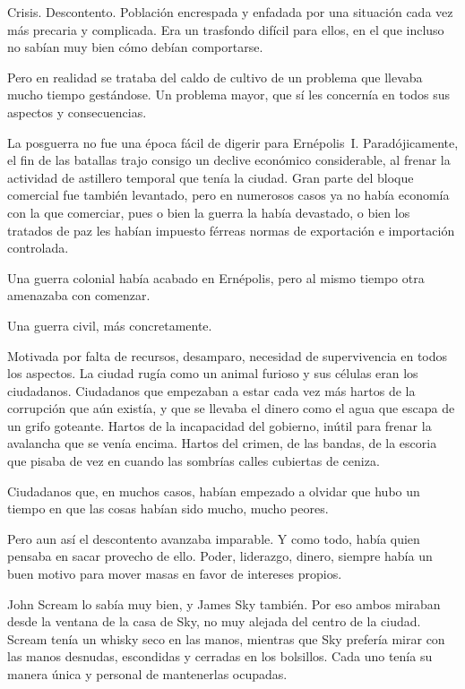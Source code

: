 \noindent
Crisis. Descontento. Población encrespada y enfadada por una situación cada vez más precaria y complicada. Era un trasfondo difícil para ellos, en el que incluso no sabían muy bien cómo debían comportarse.

Pero en realidad se trataba del caldo de cultivo de un problema que llevaba mucho tiempo gestándose. Un problema mayor, que sí les concernía en todos sus aspectos y consecuencias.

\parbreak\noindent
La posguerra no fue una época fácil de digerir para Ernépolis~I. Paradójicamente, el fin de las batallas trajo consigo un declive económico considerable, al frenar la actividad de astillero temporal que tenía la ciudad. Gran parte del bloque comercial fue también levantado, pero en numerosos casos ya no había economía con la que comerciar, pues o bien la guerra la había devastado, o bien los tratados de paz les habían impuesto férreas normas de exportación e importación controlada.

Una guerra colonial había acabado en Ernépolis, pero al mismo tiempo otra amenazaba con comenzar.

Una guerra civil, más concretamente.

Motivada por falta de recursos, desamparo, necesidad de supervivencia en todos los aspectos. La ciudad rugía como un animal furioso y sus células eran los ciudadanos. Ciudadanos que empezaban a estar cada vez más hartos de la corrupción que aún existía, y que se llevaba el dinero como el agua que escapa de un grifo goteante. Hartos de la incapacidad del gobierno, inútil para frenar la avalancha que se venía encima. Hartos del crimen, de las bandas, de la escoria que pisaba de vez en cuando las sombrías calles cubiertas de ceniza.

Ciudadanos que, en muchos casos, habían empezado a olvidar que hubo un tiempo en que las cosas habían sido mucho, mucho peores.

Pero aun así el descontento avanzaba imparable. Y como todo, había quien pensaba en sacar provecho de ello. Poder, liderazgo, dinero, siempre había un buen motivo para mover masas en favor de intereses propios.

John Scream lo sabía muy bien, y James Sky también. Por eso ambos miraban desde la ventana de la casa de Sky, no muy alejada del centro de la ciudad. Scream tenía un whisky seco en las manos, mientras que Sky prefería mirar con las manos desnudas, escondidas y cerradas en los bolsillos. Cada uno tenía su manera única y personal de mantenerlas ocupadas.

